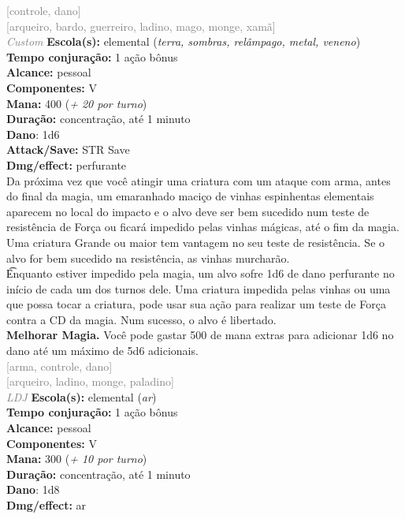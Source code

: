 \documentclass{RPG_Adventure}[2021/10/20]
\begin{document}
{\scriptsize \textcolor{gray}{[controle, dano]\\}}
{\scriptsize \textcolor{gray}{[arqueiro, bardo, guerreiro, ladino, mago, monge, xamã]\\}}
{\tiny \textcolor{gray}{\textit{Custom}}}\jump{}
{\small \t \textbf{Escola(s):} elemental (\textit{terra, sombras, relâmpago, metal, veneno})\\\t \textbf{Tempo conjuração:} 1 ação bônus\\\t \textbf{Alcance:} pessoal\\\t \textbf{Componentes:} V\\\t \textbf{Mana:} 400 (\textit{+ 20 por turno})\\\t \textbf{Duração:} concentração, até 1 minuto\\\t \textbf{Dano}: 1d6\\\t \textbf{Attack/Save:} STR Save\\\t \textbf{Dmg/effect:} perfurante\\}
{\normalsize Da próxima vez que você atingir uma criatura com um ataque com arma, antes do final da magia, um emaranhado maciço de vinhas espinhentas elementais aparecem no local do impacto e o alvo deve ser bem sucedido num teste de resistência de Força ou ficará impedido pelas vinhas mágicas, até o fim da magia. Uma criatura Grande ou maior tem vantagem no seu teste de resistência. Se o alvo for bem sucedido na resistência, as vinhas murcharão.\\\t Enquanto estiver impedido pela magia, um alvo sofre 1d6 de dano perfurante no início de cada um dos turnos dele. Uma criatura impedida pelas vinhas ou uma que possa tocar a criatura, pode usar sua ação para realizar um teste de Força contra a CD da magia. Num sucesso, o alvo é libertado.\\\t \textbf{Melhorar Magia.} Você pode gastar 500 de mana extras para adicionar 1d6 no dano até um máximo de 5d6 adicionais.\\}
{\scriptsize \textcolor{gray}{[arma, controle, dano]\\}}
{\scriptsize \textcolor{gray}{[arqueiro, ladino, monge, paladino]\\}}
{\tiny \textcolor{gray}{\textit{LDJ}}}\jump{}
{\small \t \textbf{Escola(s):} elemental (\textit{ar})\\\t \textbf{Tempo conjuração:} 1 ação bônus\\\t \textbf{Alcance:} pessoal\\\t \textbf{Componentes:} V\\\t \textbf{Mana:} 300 (\textit{+ 10 por turno})\\\t \textbf{Duração:} concentração, até 1 minuto\\\t \textbf{Dano}: 1d8\\\t \textbf{Dmg/effect:} ar\\}
\end{document}
